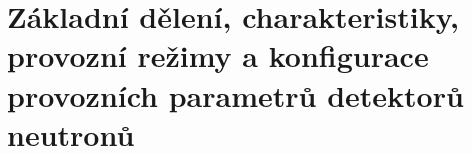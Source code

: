 \section[Režimy a provoz neutronových detektorů]{Základní dělení, charakteristiky, provozní režimy a konfigurace provozních parametrů detektorů neutronů}

